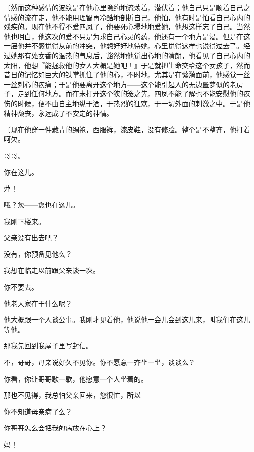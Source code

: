 {\fangsong〔然而这种感情的波纹是在他心里隐约地流荡着，潜伏着；他自己只是顺着自己之情感的流在走，他不能用理智再冷酷地剖析自己，他怕，他有时是怕看自己心内的残疾的。现在他不得不爱四凤了，他要死心塌地地爱她，他想这样忘了自己。当然他也明白，他这次的爱不只是为求自己心灵的药，他还有一个地方是渴。但是在这一层他并不感觉得从前的冲突，他想好好地待她，心里觉得这样也说得过去了。经过她那有处女香的温热的气息后，豁然地他觉出心地的清朗，他看见了自己心内的太阳，他想『能拯救他的女人大概是她吧！』于是就把生命交给这个女孩子，然而昔日的记忆如巨大的铁掌抓住了他的心，不时地，尤其是在蘩漪面前，他感觉一丝一丝刺心的疚痛；于是他要离开这个地方——这个能引起人的无边噩梦似的老房子，走到任何地方。而在未打开这个狭的笼之先，四凤不能了解也不能安慰他的疚伤的时候，便不由自主地纵于酒，于热烈的狂欢，于一切外面的刺激之中。于是他精神颓丧，永远成了不安定的神情。}

{\fangsong〔现在他穿一件藏青的绸袍，西服裤，漆皮鞋，没有修脸。整个是不整齐，他打着呵欠。}

哥哥。

你在这儿。

萍！

哦？您——您也在这儿。

我刚下楼来。

父亲没有出去吧？

没有，你预备见他么？

我想在临走以前跟父亲谈一次。

你不要去。

他老人家在干什么呢？

他大概跟一个人谈公事。我刚才见着他，他说他一会儿会到这儿来，叫我们在这儿等他。

那我先回到我屋子里写封信。

不，哥哥，母亲说好久不见你。你不愿意一齐坐一坐，谈谈么？

你看，你让哥哥歇一歇，他愿意一个人坐着的。

那也不见得，我总怕父亲回来，您很忙，所以——

你不知道母亲病了么？

你哥哥怎么会把我的病放在心上？

妈！

